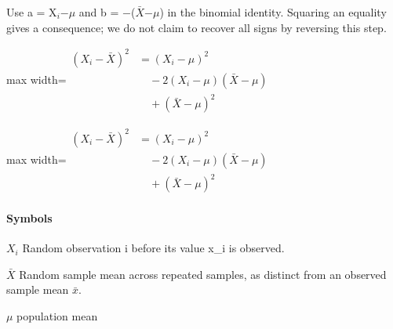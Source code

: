 \documentclass[11pt,a4paper]{article}
\begin{document}
Use a = X\ensuremath{{}_i}\ensuremath{-}\ensuremath{\mu} and b = \ensuremath{-}(\ensuremath{\bar{X}}\ensuremath{-}\ensuremath{\mu}) in the binomial identity. Squaring an equality gives a consequence; we do not claim to recover all signs by reversing this step.
\begin{center}\begin{adjustbox}{max width=\linewidth}$\displaystyle \begin{aligned}(X_i-\bar X)^2&=(X_i-\mu)^2\\&\quad-2(X_i-\mu)(\bar X-\mu)\\&\quad+(\bar X-\mu)^2\end{aligned}$\end{adjustbox}\end{center}


\begin{center}\begin{adjustbox}{max width=\linewidth}$\displaystyle \begin{aligned}(X_i-\bar X)^2&=(X_i-\mu)^2\\&\quad-2(X_i-\mu)(\bar X-\mu)\\&\quad+(\bar X-\mu)^2\end{aligned}$\end{adjustbox}\end{center}

\paragraph{Symbols}
\par\noindent\textbf{\(X_i\)} Random observation i before its value x\_i is observed.
\par\noindent\textbf{\(\bar X\)} Random sample mean across repeated samples, as distinct from an observed sample mean \ensuremath{\bar{x}}.
\par\noindent\textbf{\(\mu\)} population mean
\end{document}
